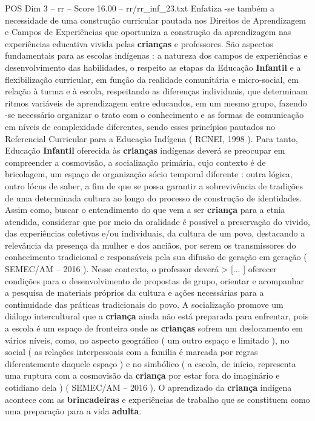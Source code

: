 \begin{textsample}{POS Dim 3 – rr – Score 16.00 – rr/rr\_inf\_23.txt}
Enfatiza -se também a necessidade de uma construção curricular pautada nos Direitos de Aprendizagem e Campos de Experiências que oportuniza a construção da aprendizagem nas experiências educativa vivida pelas \textbf{crianças} e professores.
São aspectos fundamentais para as escolas indígenas : a natureza dos campos de experiências e desenvolvimento das habilidades, o respeito as etapas da Educação \textbf{Infantil} e a flexibilização curricular, em função da realidade comunitária e micro-social, em relação à turma e à escola, respeitando as diferenças individuais, que determinam ritmos variáveis de aprendizagem entre educandos, em um mesmo grupo, fazendo -se necessário organizar o trato com o conhecimento e as formas de comunicação em níveis de complexidade diferentes, sendo esses princípios pautados no Referencial Curricular para a Educação Indígena ( RCNEI, 1998 ).
Para tanto, Educação \textbf{Infantil} oferecida às \textbf{crianças} indígenas deverá se preocupar em compreender a cosmovisão, a socialização primária, cujo contexto é de bricolagem, um espaço de organização sócio temporal diferente : outra lógica, outro lócus de saber, a fim de que se possa garantir a sobrevivência de tradições de uma determinada cultura ao longo do processo de construção de identidades.
Assim como, buscar o entendimento do que vem a ser \textbf{criança} para a etnia atendida, considerar que por meio da oralidade é possível a preservação do vivido, das experiências coletivas e/ou individuais, da cultura de um povo, destacando a relevância da presença da mulher e dos anciãos, por serem os transmissores do conhecimento tradicional e responsáveis pela sua difusão de geração em geração ( SEMEC/AM – 2016 ).
Nesse contexto, o professor deverá > [... ] oferecer condições para o desenvolvimento de propostas de grupo, orientar e acompanhar a pesquisa de materiais próprios da cultura e ações necessárias para a continuidade das práticas tradicionais do povo.
A socialização promove um diálogo intercultural que a \textbf{criança} ainda não está preparada para enfrentar, pois a escola é um espaço de fronteira onde as \textbf{crianças} sofrem um deslocamento em vários níveis, como, no aspecto geográfico ( um outro espaço e limitado ), no social ( as relações interpessoais com a família é marcada por regras diferentemente daquele espaço ) e no simbólico ( a escola, de início, representa uma ruptura com a cosmovisão da \textbf{criança} por estar fora do imaginário e cotidiano dela ) ( SEMEC/AM – 2016 ).
O aprendizado da \textbf{criança} indígena acontece com as \textbf{brincadeiras} e experiências de trabalho que se constituem como uma preparação para a vida \textbf{adulta}.

\end{textsample}
